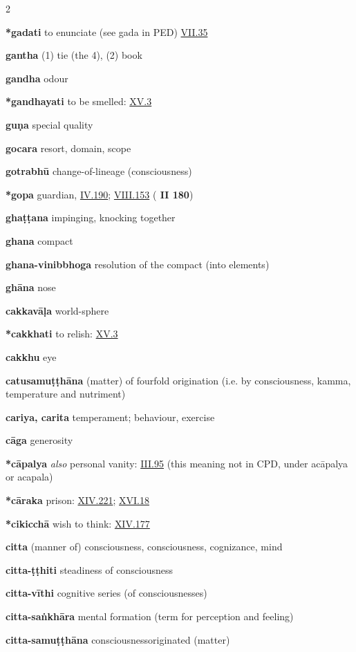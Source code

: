 \begin{multicols}{2}
\begin{vismHanging}
\par\textbf{*gadati} to enunciate (see gada in PED) \hyperlink{VII.35}{VII.35}{} 
\par\textbf{gantha} (1) tie (the 4), (2) book
\par\textbf{gandha} odour
\par\textbf{*gandhayati} to be smelled: \hyperlink{XV.3}{XV.3}{}
\par\textbf{guṇa} special quality
\par\textbf{gocara} resort, domain, scope
\par\textbf{gotrabhū} change-of-lineage (consciousness) 
\par\textbf{*gopa} guardian, \hyperlink{IV.190}{IV.190}{}; \hyperlink{VIII.153}{VIII.153}{} (\textbf{\cite{M} II 180}) 
\par\textbf{ghaṭṭana} impinging, knocking together
\par\textbf{ghana} compact
\par\textbf{ghana-vinibbhoga} resolution of the compact (into elements) 
\par\textbf{ghāna} nose
\par\textbf{cakkavāḷa} world-sphere
\par\textbf{*cakkhati} to relish: \hyperlink{XV.3}{XV.3}{}
\par\textbf{cakkhu} eye
\par\textbf{catusamuṭṭhāna} (matter) of fourfold origination (i.e. by consciousness, kamma, temperature and nutriment) 
\par\textbf{cariya, carita} temperament; behaviour, exercise 
\par\textbf{cāga} generosity
\par\textbf{*cāpalya} \emph{also }personal vanity: \hyperlink{III.95}{III.95}{} (this meaning not in CPD, under acāpalya or acapala) 
\par\textbf{*cāraka} prison: \hyperlink{XIV.221}{XIV.221}{}; \hyperlink{XVI.18}{XVI.18}{}
\par\textbf{*cikicchā} wish to think: \hyperlink{XIV.177}{XIV.177}{}
\par\textbf{citta} (manner of) consciousness, consciousness, cognizance, mind 
\par\textbf{citta-ṭṭhiti} steadiness of consciousness
\par\textbf{citta-vīthi} cognitive series (of consciousnesses) 
\par\textbf{citta-saṅkhāra} mental formation (term for perception and feeling) 
\par\textbf{citta-samuṭṭhāna} consciousnessoriginated (matter) 

\end{vismHanging}
\end{multicols}
